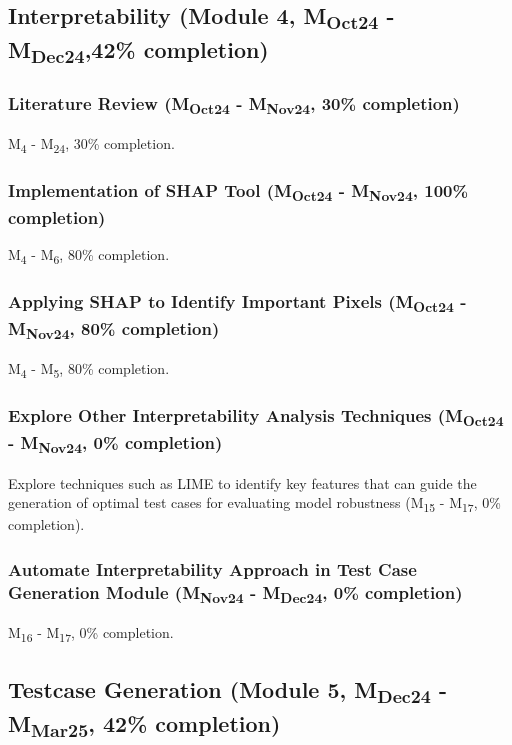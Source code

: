 \subsection{Interpretability (Module 4, M\textsubscript{Oct24} - M\textsubscript{Dec24},42\% completion)}
\subsubsection{Literature Review (M\textsubscript{Oct24} - M\textsubscript{Nov24}, 30\% completion)}
M\textsubscript{4} - M\textsubscript{24}, 30\% completion.

\subsubsection{Implementation of SHAP Tool (M\textsubscript{Oct24} - M\textsubscript{Nov24}, 100\% completion)}
M\textsubscript{4} - M\textsubscript{6}, 80\% completion.

\subsubsection{Applying SHAP to Identify Important Pixels (M\textsubscript{Oct24} - M\textsubscript{Nov24}, 80\% completion)}
M\textsubscript{4} - M\textsubscript{5}, 80\% completion.

\subsubsection{Explore Other Interpretability Analysis Techniques (M\textsubscript{Oct24} - M\textsubscript{Nov24}, 0\% completion)}
Explore techniques such as LIME to identify key features that can guide the generation of optimal test cases for evaluating model robustness (M\textsubscript{15} - M\textsubscript{17}, 0\% completion).

\subsubsection{Automate Interpretability Approach in Test Case Generation Module (M\textsubscript{Nov24} - M\textsubscript{Dec24}, 0\% completion)}
M\textsubscript{16} - M\textsubscript{17}, 0\% completion.


\subsection{Testcase Generation (Module 5, M\textsubscript{Dec24} - M\textsubscript{Mar25}, 42\% completion)}

